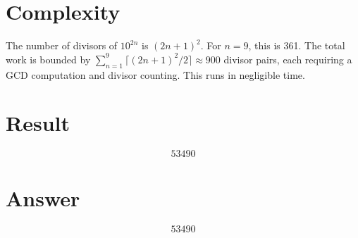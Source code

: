 \documentclass[12pt,a4paper]{article}
\begin{document}
\section{Complexity}

The number of divisors of $10^{2n}$ is $(2n+1)^2$. For $n=9$, this is 361. The total work is bounded by $\sum_{n=1}^{9} \lceil(2n+1)^2/2\rceil \approx 900$ divisor pairs, each requiring a GCD computation and divisor counting. This runs in negligible time.

\section{Result}

\[
\boxed{53490}
\]

\section{Answer}

\[
\boxed{53490}
\]
\end{document}

